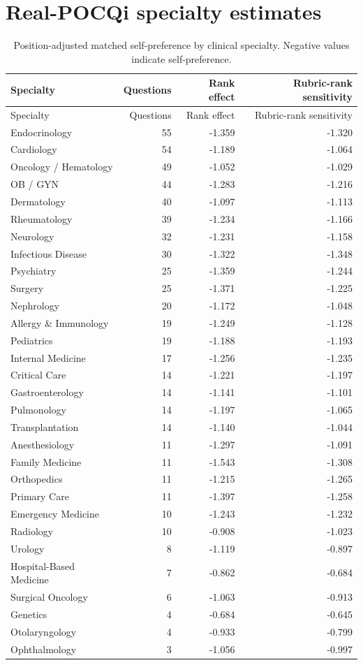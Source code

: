 \documentclass[11pt]{article}
\begin{document}
\section{Real-POCQi specialty estimates}

\begin{longtable}{lrrr}
\caption{Position-adjusted matched self-preference by clinical specialty.
Negative values indicate self-preference.}\label{tab:specialty}\\
\toprule
Specialty & Questions & Rank effect & Rubric-rank sensitivity \\
\midrule
\endfirsthead
\toprule
Specialty & Questions & Rank effect & Rubric-rank sensitivity \\
\midrule
\endhead
Endocrinology & 55 & -1.359 & -1.320 \\
Cardiology & 54 & -1.189 & -1.064 \\
Oncology / Hematology & 49 & -1.052 & -1.029 \\
OB / GYN & 44 & -1.283 & -1.216 \\
Dermatology & 40 & -1.097 & -1.113 \\
Rheumatology & 39 & -1.234 & -1.166 \\
Neurology & 32 & -1.231 & -1.158 \\
Infectious Disease & 30 & -1.322 & -1.348 \\
Psychiatry & 25 & -1.359 & -1.244 \\
Surgery & 25 & -1.371 & -1.225 \\
Nephrology & 20 & -1.172 & -1.048 \\
Allergy \& Immunology & 19 & -1.249 & -1.128 \\
Pediatrics & 19 & -1.188 & -1.193 \\
Internal Medicine & 17 & -1.256 & -1.235 \\
Critical Care & 14 & -1.221 & -1.197 \\
Gastroenterology & 14 & -1.141 & -1.101 \\
Pulmonology & 14 & -1.197 & -1.065 \\
Transplantation & 14 & -1.140 & -1.044 \\
Anesthesiology & 11 & -1.297 & -1.091 \\
Family Medicine & 11 & -1.543 & -1.308 \\
Orthopedics & 11 & -1.215 & -1.265 \\
Primary Care & 11 & -1.397 & -1.258 \\
Emergency Medicine & 10 & -1.243 & -1.232 \\
Radiology & 10 & -0.908 & -1.023 \\
Urology & 8 & -1.119 & -0.897 \\
Hospital-Based Medicine & 7 & -0.862 & -0.684 \\
Surgical Oncology & 6 & -1.063 & -0.913 \\
Genetics & 4 & -0.684 & -0.645 \\
Otolaryngology & 4 & -0.933 & -0.799 \\
Ophthalmology & 3 & -1.056 & -0.997 \\
\bottomrule
\end{longtable}
\end{document}
